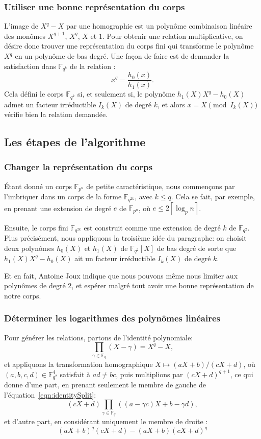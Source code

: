 \documentclass{beamer}
\theoremstyle{definition}
\theoremstyle{remark}
\def\gf #1{\mathbb{F}_{#1}}
\def\ceil #1{\left\lceil#1\right\rceil}
\begin{document}
\begin{frame}
  \frametitle{Utiliser une bonne représentation du corps}
  L'image de $X^q-X$ par une homographie est un polynôme combinaison linéaire des monômes $X^{q+1}$, $X^q$, $X$ et $1$. Pour obtenir une relation multiplicative, on désire donc trouver une représentation du corps fini qui transforme le polynôme $X^q$ en un polynôme de bas degré. Une façon de faire est de demander la satisfaction dans $\gf{q^k}$ de la relation :
  $$x^q = \frac{h_0(x)}{h_1(x)}.$$
  Cela défini le corps $\gf{q^k}$ si, et seulement si, le polynôme $h_1(X)X^q - h_0(X)$ admet un facteur irréductible $I_k(X)$ de degré $k$, et alors $x = X \pmod{I_k(X)}$ vérifie bien la relation demandée.
\end{frame}

\subsection{Les étapes de l'algorithme}
\begin{frame}
  \frametitle{Changer la représentation du corps}
  Étant donné un corps $\gf{p^n}$ de petite caractéristique, nous commençons par l'imbriquer dans un corps de la forme $\gf{q^{2k}}$, avec $k \leqslant q$. Cela se fait, par exemple, en prenant une extension de degré $e$ de $\gf{p^n}$, où $e \leqslant 2 \ceil{\log_p n}$.

  Ensuite, le corps fini $\gf{q^{2k}}$ est construit comme une extension de degré $k$ de $\gf{q^2}$. Plus précisément, nous appliquons la troisième idée du paragraphe: on choisit deux polynômes $h_0(X)$ et $h_1(X)$ de $\gf{q^2}[X]$ de bas degré de sorte que $h_1(X)X^q - h_0(X)$ ait un facteur irréductible $I_k(X)$ de degré $k$.

Et en fait, Antoine Joux indique que nous pouvons même nous limiter aux polynômes de degré 2, et espérer malgré tout avoir une bonne représentation de notre corps.
\end{frame}

\begin{frame}
  \frametitle{Déterminer les logarithmes des polynômes linéaires}
  Pour générer les relations, partons de l'identité polynomiale:
  \begin{equation}\label{eqn:identitySplit}
  \prod_{\gamma\in\gf{q}} (X-\gamma) = X^q-X,
  \end{equation}
  et appliquons la transformation homographique $X \mapsto (aX+b)/(cX+d)$, où $(a,b,c,d)\in\gf{q^2}^4$ satisfait à $ad\neq bc$, puis multiplions par $(cX+d)^{q+1}$, ce qui donne d'une part, en prenant seulement le membre de gauche de l'équation~\ref{eqn:identitySplit}:
  $$(cX+d) \prod_{\gamma\in\gf{q}} ((a-\gamma c)X+b-\gamma d),$$
  et d'autre part, en considérant uniquement le membre de droite :
  $$(aX+b)^q(cX+d) - (aX+b)(cX+d)^q$$
\end{frame}
\end{document}
